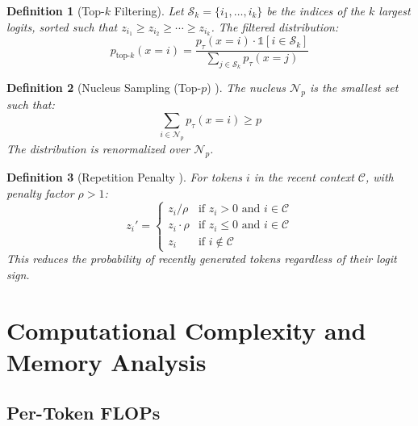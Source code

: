 \documentclass[12pt,a4paper]{article}
\newtheorem{definition}{Definition}[section]
\begin{document}
\begin{definition}[Top-$k$ Filtering]
Let $\mathcal{S}_k = \{i_1, \ldots, i_k\}$ be the indices of the $k$ largest logits, sorted such that $z_{i_1} \geq z_{i_2} \geq \cdots \geq z_{i_k}$. The filtered distribution:
\begin{equation}
p_{\text{top-}k}(x=i) = \frac{p_\tau(x=i) \cdot \mathbb{1}[i \in \mathcal{S}_k]}{\displaystyle\sum_{j \in \mathcal{S}_k} p_\tau(x=j)}
\label{eq:topk}
\end{equation}
\end{definition}

\begin{definition}[Nucleus Sampling (Top-$p$) \citep{holtzman2020nucleus}]
The nucleus $\mathcal{N}_p$ is the smallest set such that:
\begin{equation}
\sum_{i \in \mathcal{N}_p} p_\tau(x = i) \geq p
\label{eq:nucleus_def}
\end{equation}
The distribution is renormalized over $\mathcal{N}_p$.
\end{definition}

\begin{definition}[Repetition Penalty \citep{keskar2019ctrl}]
For tokens $i$ in the recent context $\mathcal{C}$, with penalty factor $\rho > 1$:
\begin{equation}
z_i' = \begin{cases}
z_i / \rho & \text{if } z_i > 0 \text{ and } i \in \mathcal{C} \\
z_i \cdot \rho & \text{if } z_i \leq 0 \text{ and } i \in \mathcal{C} \\
z_i & \text{if } i \notin \mathcal{C}
\end{cases}
\label{eq:rep_penalty}
\end{equation}
This reduces the probability of recently generated tokens regardless of their logit sign.
\end{definition}

\section{Computational Complexity and Memory Analysis}
\label{sec:complexity}

\subsection{Per-Token FLOPs}
\end{document}
